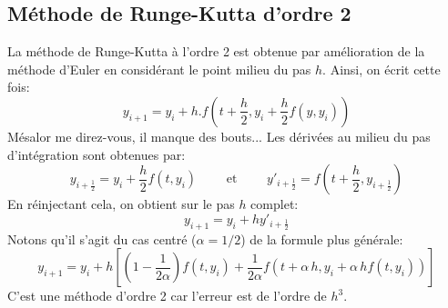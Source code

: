 \subsection{Méthode de Runge-Kutta d'ordre 2} La méthode de Runge-Kutta à l'ordre 2 est obtenue par amélioration de la méthode d'Euler en considérant le point milieu du pas $h$. Ainsi, on écrit cette fois:
\begin{equation}
y_{i+1}=y_i+h.f\left(t+\frac{h}2,y_i+\frac{h}2f(y,y_i)\right)
\end{equation}
Mésalor me direz-vous, il manque des bouts... Les dérivées au milieu du pas d'intégration sont obtenues par:
\begin{equation}
y_{i+\frac{1}{2}} = y_i + \frac{h}{2} f \left( t, y_i \right) \qquad \text{ et } \qquad y'_{i+\frac{1}{2}} = f \left( t + \frac{h}{2}, y_{i+\frac{1}{2}} \right)
\end{equation}
En réinjectant cela, on obtient sur le pas $h$ complet:
\begin{equation}
y_{i+1} = y_i + h y'_{i+\frac{1}{2}}
\end{equation}
Notons qu'il s'agit du cas centré ($\alpha=1/2$) de la formule plus générale:
\begin{equation}
y_{i+1} = y_i + h\left[\left(1-\frac1{2\alpha}\right)f \left( t, y_i \right) + \frac1{2\alpha}f \left( t + \alpha\,h, y_i + \alpha\,h f \left( t, y_i \right) \right)\right]
\end{equation}
C'est une méthode d'ordre 2 car l'erreur est de l'ordre de $h^3$. 
